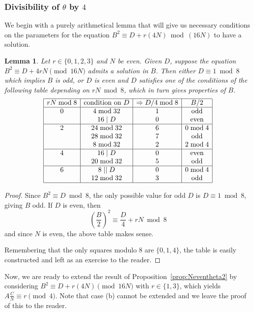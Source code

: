 \documentclass[12pt,twoside,leqno]{article}
\newtheorem{lemma}[theorem]{Lemma}
\numberwithin{equation}{section}
\begin{document}
\subsubsection*{Divisibility of \texorpdfstring {$\theta$}{theta} by $4$}

We begin with a purely arithmetical lemma that will give us necessary
conditions on the parameters for the equation $B^2\equiv D + r (4N)
\bmod (16N)$ to have a solution.
\begin{lemma}
\label{lem:DB4}
Let $r \in \{0, 1, 2, 3\}$ and $N$ be even. Given $D$,
suppose the equation $B^2 \equiv D + 4 r N \pmod {16 N}$ admits a
solution in $B$. Then either $D\equiv 1\bmod 8$ which implies $B$ is
odd, or $D$ is even and $D$ satisfies
one of the conditions of the following table depending on $rN\bmod 8$,
which in turn gives properties of $B$.
$$\begin{array}{|c|c|c|c|}\hline
r N \bmod 8 & \text{condition on } D & \Rightarrow D/4 \bmod 8 & B/2 \\ \hline
0 & 4 \bmod 32   & 1 & \text{odd} \\
  & 16 \mid D    & 0 &\text{even} \\ \hline
2 & 24 \bmod 32  & 6 & 0\bmod 4 \\
  & 28 \bmod 32  & 7 & \text{odd} \\
  &  8 \bmod 32  & 2 & 2 \bmod 4 \\ \hline
4 & 16 \mid D    & 0 & \text{even} \\
  & 20\bmod 32   & 5 & \text{odd} \\ \hline
6 & 8 \mid\mid D & 0 & 0\bmod 4 \\
  & 12 \bmod 32  & 3 & \text{odd} \\ \hline
\end{array}$$
\end{lemma}

\begin{proof}
Since $B^2 \equiv D \bmod 8$, the only possible value for odd $D$ is
$D \equiv 1\bmod 8$, giving $B$ odd. If $D$ is even, then
$$\left(\frac{B}{2}\right)^2 \equiv \frac{D}{4} + r N \bmod 8$$
and since $N$ is even, the above table makes sense.

Remembering that the only squares modulo 8 are $\{0, 1, 4\}$, the
table is easily constructed and left as an exercise to the reader.
\end{proof}

Now, we are ready to extend the result of
Proposition~\ref{prop:Neventheta2} by considering $B^2 \equiv D + r (4
N) \pmod {16 N}$ with $r \in \{ 1, 3 \}$, which yields $A \frac{C}{N}
\equiv r\pmod 4$. Note that case (b) cannot be extended and we leave
the proof of this to the reader.
\end{document}
